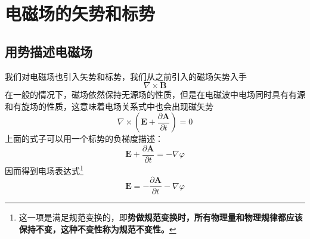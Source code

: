 \section{电磁场的矢势和标势}
    \subsection{用势描述电磁场}
        我们对电磁场也引入矢势和标势，我们从之前引入的磁场矢势入手\[\nabla \times \boldsymbol{B} \]在一般的情况下，磁场依然保持无源场的性质，但是在电磁波中电场同时具有有源和有旋场的性质，这意味着电场关系式中也会出现磁矢势
            \begin{equation}
                \nabla \times (\boldsymbol{E} +\frac{\partial \boldsymbol{A}}{\partial t})=0
            \end{equation}
        上面的式子可以用一个标势的负梯度描述：
            \begin{equation}
                \boldsymbol{E} + \frac{\partial \boldsymbol{A}}{\partial t} = -\nabla \varphi
            \end{equation}
        因而得到电场表达式\footnote{这一项是满足规范变换的，即\textbf{势做规范变换时，所有物理量和物理规律都应该保持不变，这种不变性称为规范不变性。}}
            \begin{equation}
                \boldsymbol{E} = -\frac{\partial \boldsymbol{A}}{\partial t} -\nabla \varphi
            \end{equation}
